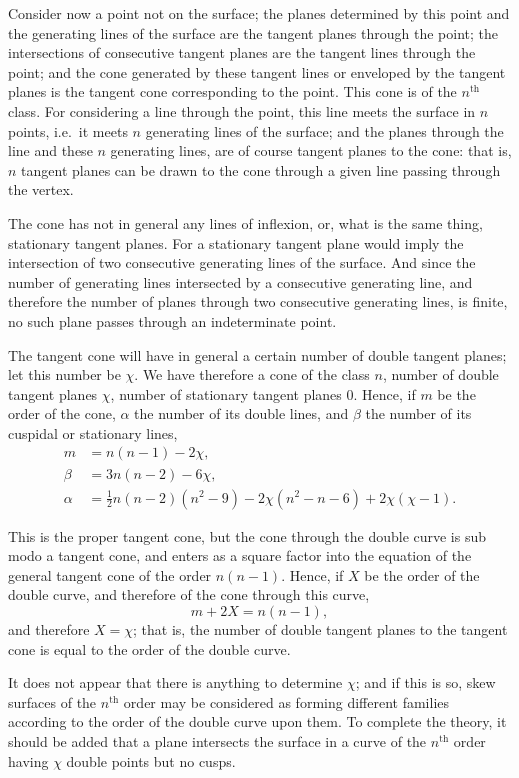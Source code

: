 \documentclass[11pt,a4paper]{book}
\begin{document}
Consider now a point not on the surface; the planes determined by this point and the generating lines of the surface are the tangent planes through the point; the intersections of consecutive tangent planes are the tangent lines through the point; and the cone generated by these tangent lines or enveloped by the tangent planes is the tangent cone corresponding to the point. This cone is of the $n^{\text{th}}$ class. For considering a line through the point, this line meets the surface in $n$ points, i.e.\ it meets $n$ generating lines of the surface; and the planes through the line and these $n$ generating lines, are of course tangent planes to the cone: that is, $n$ tangent planes can be drawn to the cone through a given line passing through the vertex.

The cone has not in general any lines of inflexion, or, what is the same thing, stationary tangent planes. For a stationary tangent plane would imply the intersection of two consecutive generating lines of the surface. And since the number of generating lines intersected by a consecutive generating line, and therefore the number of planes through two consecutive generating lines, is finite, no such plane passes through an indeterminate point.

The tangent cone will have in general a certain number of double tangent planes; let this number be $\chi$. We have therefore a cone of the class $n$, number of double tangent planes $\chi$, number of stationary tangent planes $0$. Hence, if $m$ be the order of the cone, $\alpha$ the number of its double lines, and $\beta$ the number of its cuspidal or stationary lines,
\begin{align*}
m &= n(n-1) - 2\chi, \\
\beta &= 3n(n-2) - 6\chi, \\
\alpha &= \tfrac{1}{2}n(n-2)(n^2-9) - 2\chi(n^2-n-6) + 2\chi(\chi-1).
\end{align*}

This is the proper tangent cone, but the cone through the double curve is sub modo a tangent cone, and enters as a square factor into the equation of the general tangent cone of the order $n(n-1)$. Hence, if $X$ be the order of the double curve, and therefore of the cone through this curve,
\[m + 2X = n(n-1),\]
and therefore $X = \chi$; that is, the number of double tangent planes to the tangent cone is equal to the order of the double curve.

It does not appear that there is anything to determine $\chi$; and if this is so, skew surfaces of the $n^{\text{th}}$ order may be considered as forming different families according to the order of the double curve upon them. To complete the theory, it should be added that a plane intersects the surface in a curve of the $n^{\text{th}}$ order having $\chi$ double points but no cusps.
\clearpage
\end{document}
